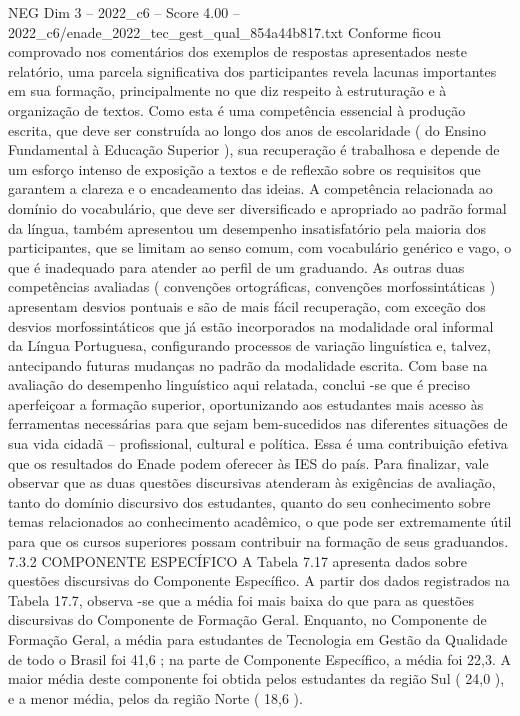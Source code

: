 \begin{textsample}{NEG Dim 3 – 2022\_c6 – Score 4.00 – 2022\_c6/enade\_2022\_tec\_gest\_qual\_854a44b817.txt}
Conforme ficou comprovado nos comentários dos exemplos de respostas apresentados neste relatório, uma parcela significativa dos participantes revela lacunas importantes em sua formação, principalmente no que diz respeito à estruturação e à organização de textos.
Como esta é uma competência essencial à produção escrita, que deve ser construída ao longo dos anos de escolaridade ( do Ensino Fundamental à Educação Superior ), sua recuperação é trabalhosa e depende de um esforço intenso de exposição a textos e de reflexão sobre os requisitos que garantem a clareza e o encadeamento das ideias.
A competência relacionada ao domínio do vocabulário, que deve ser diversificado e apropriado ao padrão formal da língua, também apresentou um desempenho insatisfatório pela maioria dos participantes, que se limitam ao senso comum, com vocabulário genérico e vago, o que é inadequado para atender ao perfil de um graduando.
As outras duas competências avaliadas ( convenções ortográficas, convenções morfossintáticas ) apresentam desvios pontuais e são de mais fácil recuperação, com exceção dos desvios morfossintáticos que já estão incorporados na modalidade oral informal da Língua Portuguesa, configurando processos de variação linguística e, talvez, antecipando futuras mudanças no padrão da modalidade escrita.
Com base na avaliação do desempenho linguístico aqui relatada, conclui -se que é preciso aperfeiçoar a formação superior, oportunizando aos estudantes mais acesso às ferramentas necessárias para que sejam bem-sucedidos nas diferentes situações de sua vida cidadã – profissional, cultural e política.
Essa é uma contribuição efetiva que os resultados do Enade podem oferecer às IES do país.
Para finalizar, vale observar que as duas questões discursivas atenderam às exigências de avaliação, tanto do domínio discursivo dos estudantes, quanto do seu conhecimento sobre temas relacionados ao conhecimento acadêmico, o que pode ser extremamente útil para que os cursos superiores possam contribuir na formação de seus graduandos. 7.3.2 COMPONENTE ESPECÍFICO A Tabela 7.17 apresenta dados sobre questões discursivas do Componente Específico.
A partir dos dados registrados na Tabela 17.7, observa -se que a média foi mais baixa do que para as questões discursivas do Componente de Formação Geral.
Enquanto, no Componente de Formação Geral, a média para estudantes de Tecnologia em Gestão da Qualidade de todo o Brasil foi 41,6 ; na parte de Componente Específico, a média foi 22,3.
A maior média deste componente foi obtida pelos estudantes da região Sul ( 24,0 ), e a menor média, pelos da região Norte ( 18,6 ).

\end{textsample}
